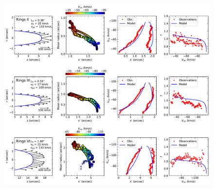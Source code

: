 \documentclass[12pt]{mythesis}
\begin{document}
\begin{figure}[p!]
\begin{center}
\includegraphics[width=1.0\textwidth]{figures/bowshock_fitresults.pdf}
\end{center}
\end{figure}
\end{document}
